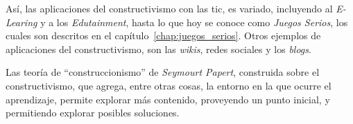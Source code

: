 Así, las aplicaciones del constructivismo con las \Gls{tic}, es variado,
incluyendo al \textit{E-Learing} y a los \textit{Edutainment}, hasta lo que hoy
se conoce como \textit{Juegos Serios}, los cuales son descritos en el
capítulo~\ref{chap:juegos_serios}. Otros ejemplos de aplicaciones del
constructivismo, son las \textit{wikis}, redes sociales y los
\textit{blogs}\cite{hernandez:constructivismo}.

Las teoría de \enquote{construccionismo} de \textit{Seymourt Papert},
construida sobre el constructivismo, que agrega, entre otras cosas, la
entorno en la que ocurre el aprendizaje\cite{egenfeldt2007third}, permite
explorar más contenido, proveyendo un punto inicial, y permitiendo explorar
posibles soluciones.
